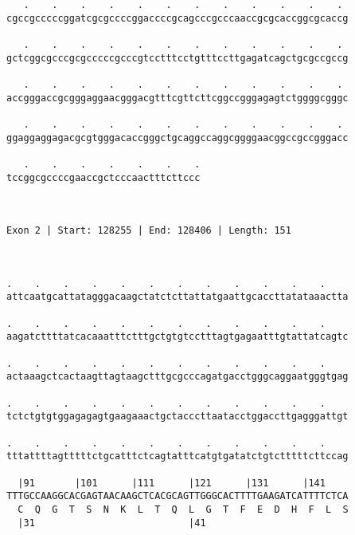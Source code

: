 \documentclass{article}
\begin{document}
\begin{Verbatim}
   .    .    .    .    .    .    .    .    .    .    .    . 
cgccgcccccggatcgcgccccggaccccgcagcccgcccaaccgcgcaccggcgcaccg
                                                            
   .    .    .    .    .    .    .    .    .    .    .    . 
gctcggcgcccgcgcccccgcccgtcctttcctgtttccttgagatcagctgcgccgccg
                                                            
   .    .    .    .    .    .    .    .    .    .    .    . 
accgggaccgcgggaggaacgggacgtttcgttcttcggccgggagagtctggggcgggc
                                                            
   .    .    .    .    .    .    .    .    .    .    .    . 
ggaggaggagacgcgtgggacaccgggctgcaggccaggcggggaacggccgccgggacc
                                                            
   .    .    .    .    .    .    .
tccggcgccccgaaccgctcccaactttcttccc
                                  
                                  
 
Exon 2 | Start: 128255 | End: 128406 | Length: 151



.    .    .    .    .    .    .    .    .    .    .    .    
attcaatgcattatagggacaagctatctcttattatgaattgcaccttatataaactta
                                                            
.    .    .    .    .    .    .    .    .    .    .    .    
aagatcttttatcacaaatttctttgctgtgtcctttagtgagaatttgtattatcagtc
                                                            
.    .    .    .    .    .    .    .    .    .    .    .    
actaaagctcactaagttagtaagctttgcgcccagatgacctgggcaggaatgggtgag
                                                            
.    .    .    .    .    .    .    .    .    .    .    .    
tctctgtgtggagagagtgaagaaactgctacccttaatacctggaccttgagggattgt
                                                            
.    .    .    .    .    .    .    .    .    .    .    .    
tttattttagtttttctgcatttctcagtatttcatgtgatatctgtctttttcttccag
                                                            
  |91       |101      |111      |121      |131      |141    
TTTGCCAAGGCACGAGTAACAAGCTCACGCAGTTGGGCACTTTTGAAGATCATTTTCTCA
  C  Q  G  T  S  N  K  L  T  Q  L  G  T  F  E  D  H  F  L  S
  |31                           |41                         
  

\end{Verbatim}
\end{document}
